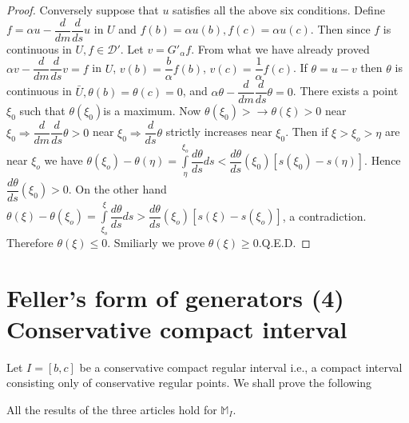 \begin{proof}
Conversely suppose that $u$ satisfies all the above six
conditions. Define $f = \alpha u - \dfrac{d}{dm}\dfrac{d}{ds} u$ in $U$
and $f(b)=\alpha u(b), f(c)=\alpha u(c)$. Then since $f$ is continuous
in $U, f \in \mathscr{D}'$. Let $v=G'_\alpha f$. From what we have
already proved $\alpha v - \dfrac{d}{dm} \dfrac{d}{ds} v =f$ in $U$, $v(b)=
\dfrac{b}{\alpha}f(b)$, $v(c) = \dfrac{1}{\alpha} f (c)$. If $\theta = u-v$ then
$\theta$ is continuous in $\bar{U}, \theta (b)= \theta (c) =0$, and
$\alpha \theta - \dfrac{d} {dm} \dfrac{d}{ds}\theta = 0$. There exists
a point $\xi_0$ such that $\theta (\xi_0) $is a maximum. Now $\theta
(\xi_0) > \to \theta (\xi) > 0$ near $\xi_0 \Rightarrow
\dfrac{d}{dm}\dfrac{d}{ds} \theta > 0$ near $\xi_0 \Rightarrow
\dfrac{d}{ds} \theta$ strictly increases near $\xi_0$. Then if $\xi >
\xi _o > \eta $ are near $\xi_o$ we have $\theta (\xi_o) - \theta
(\eta) = \int\limits^{\xi_o}_{\eta} \dfrac{d \theta}{ds} ds <
\dfrac{d\theta}{ds} (\xi_0) [ s (\xi_0)- s (\eta)]$. Hence $\dfrac{d
  \theta}{ds}(\xi_{0}) > 0$. On the other hand $\theta (\xi) - \theta (\xi_o) =
\int\limits ^{\xi}_{\xi_o} \dfrac{d\theta}{ds} ds >
\dfrac{d\theta}{ds} (\xi_o) [s (\xi) - s (\xi_o)]$, a
contradiction. Therefore $\theta(\xi) \leq 0$. Smiliarly we prove
$\theta (\xi) \geq 0$.\quad Q.E.D. 
\end{proof}


\section[Feller's form of generators...]{Feller's form of generators (4) Conservative compact
  interval}\label{chap6-sec7}%


Let $I=[b, c]$ be a conservative compact regular interval i.e., a
compact interval consisting only of conservative regular points. We
shall prove the following  

\begin{theorem*}[Feller]
  All the results of the three articles hold for $\mathbb{M}_I$.
\end{theorem*}

